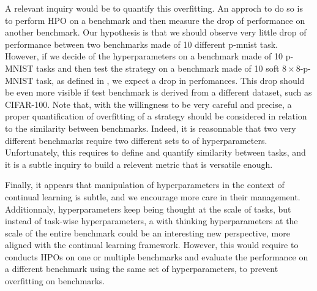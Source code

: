 \documentclass[11pt]{article}
\begin{document}
\vspace{1mm}
\noindent
A relevant inquiry would be to quantify this overfitting. An approch to do so is to perform HPO on a benchmark and then measure the drop of performance on another benchmark. Our hypothesis is that we should observe very little drop of performance between two benchmarks made of 10 different p-mnist task. However, if we decide of the hyperparameters on a benchmark made of 10 p-MNIST tasks and then test the strategy on a benchmark made of 10 soft $8\times8$-p-MNIST task, as defined in \cite{EWC}, we expect a drop in perfomances. This drop should be even more visible if test benchmark is derived from a different dataset, such as CIFAR-100. Note that, with the willingness to be very careful and precise, a proper quantification of overfitting of a strategy should be considered in relation to the similarity between benchmarks. Indeed, it is reasonnable that two very different benchmarks require two different sets to of hyperparameters. Unfortunately, this requires to define and quantify similarity between tasks, and it is a subtle inquiry to build a relevent metric that is versatile enough.

\vspace{1mm}
\noindent
Finally, it appears that manipulation of hyperparameters in the context of continual learning is subtle, and we encourage more care in their management. Additionnaly, hyperparameters keep being thought at the scale of tasks, but instead of task-wise hyperparameters, a  with thinking hyperparameters at the scale of the entire benchmark could be an interesting new perspective, more aligned with the continual learning framework. However, this would require to conducts HPOs on one or multiple benchmarks and evaluate the performance on a different benchmark using the same set of hyperparameters, to prevent overfitting on benchmarks.
\end{document}
